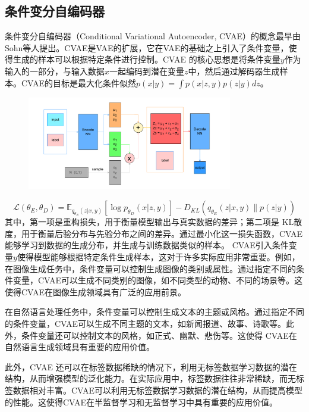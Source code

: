 \subsection{条件变分自编码器}
条件变分自编码器（Conditional Variational Autoencoder, CVAE）的概念最早由Sohn等人提出\cite{SohnLee2015ConditionalVAE}。CVAE是VAE的扩展，它在VAE的基础之上引入了条件变量，使得生成的样本可以根据特定条件进行控制。CVAE 的核心思想是将条件变量$y$作为输入的一部分，与输入数据$x$一起编码到潜在变量$z$中，然后通过解码器生成样本。CVAE的目标是最大化条件似然$p(x|y) = \int p(x|z,y) p(z|y) dz$。
\begin{figure}[htbp]
  \centering
  \includegraphics[width=0.8\textwidth]{Fig/CVAE示意图.drawio.pdf}
\end{figure}
\begin{equation}
  \mathcal{L}(\theta_E, \theta_D) = \mathbb{E}_{q_{\theta_E}(z|x,y)} \left[ \log p_{\theta_D}(x|z,y) \right] - D_{KL}(q_{\theta_E}(z|x,y) \| p(z|y))
\end{equation}
其中，第一项是重构损失，用于衡量模型输出与真实数据的差异；第二项是 KL散度，用于衡量后验分布与先验分布之间的差异。通过最小化这一损失函数，CVAE能够学习到数据的生成分布，并生成与训练数据类似的样本。
CVAE引入条件变量$y$使得模型能够根据特定条件生成样本，这对于许多实际应用非常重要。例如，在图像生成任务中，条件变量可以控制生成图像的类别或属性。通过指定不同的条件变量，CVAE可以生成不同类别的图像，如不同类型的动物、不同的场景等。这使得CVAE在图像生成领域具有广泛的应用前景。

在自然语言处理任务中，条件变量可以控制生成文本的主题或风格。通过指定不同的条件变量，CVAE可以生成不同主题的文本，如新闻报道、故事、诗歌等。此外，条件变量还可以控制文本的风格，如正式、幽默、悲伤等。这使得 CVAE在自然语言生成领域具有重要的应用价值。

此外，CVAE 还可以在标签数据稀缺的情况下，利用无标签数据学习数据的潜在结构，从而增强模型的泛化能力。在实际应用中，标签数据往往非常稀缺，而无标签数据相对丰富。CVAE可以利用无标签数据学习数据的潜在结构，从而提高模型的性能。这使得CVAE在半监督学习和无监督学习中具有重要的应用价值。

